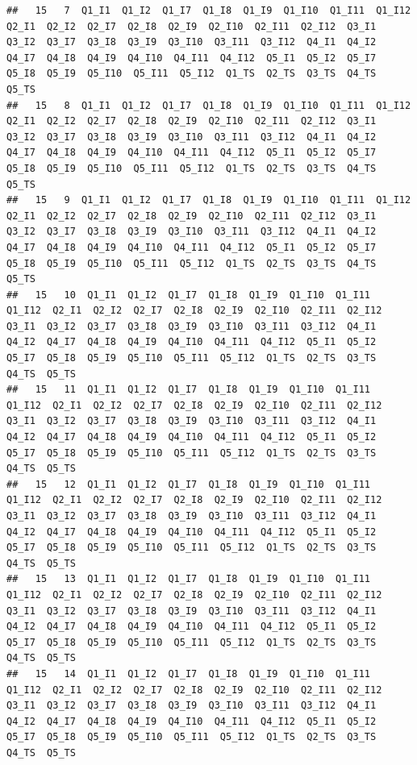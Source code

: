 \documentclass[
]{book}
\begin{document}
\begin{verbatim}
##   15   7  Q1_I1  Q1_I2  Q1_I7  Q1_I8  Q1_I9  Q1_I10  Q1_I11  Q1_I12  Q2_I1  Q2_I2  Q2_I7  Q2_I8  Q2_I9  Q2_I10  Q2_I11  Q2_I12  Q3_I1  Q3_I2  Q3_I7  Q3_I8  Q3_I9  Q3_I10  Q3_I11  Q3_I12  Q4_I1  Q4_I2  Q4_I7  Q4_I8  Q4_I9  Q4_I10  Q4_I11  Q4_I12  Q5_I1  Q5_I2  Q5_I7  Q5_I8  Q5_I9  Q5_I10  Q5_I11  Q5_I12  Q1_TS  Q2_TS  Q3_TS  Q4_TS  Q5_TS
##   15   8  Q1_I1  Q1_I2  Q1_I7  Q1_I8  Q1_I9  Q1_I10  Q1_I11  Q1_I12  Q2_I1  Q2_I2  Q2_I7  Q2_I8  Q2_I9  Q2_I10  Q2_I11  Q2_I12  Q3_I1  Q3_I2  Q3_I7  Q3_I8  Q3_I9  Q3_I10  Q3_I11  Q3_I12  Q4_I1  Q4_I2  Q4_I7  Q4_I8  Q4_I9  Q4_I10  Q4_I11  Q4_I12  Q5_I1  Q5_I2  Q5_I7  Q5_I8  Q5_I9  Q5_I10  Q5_I11  Q5_I12  Q1_TS  Q2_TS  Q3_TS  Q4_TS  Q5_TS
##   15   9  Q1_I1  Q1_I2  Q1_I7  Q1_I8  Q1_I9  Q1_I10  Q1_I11  Q1_I12  Q2_I1  Q2_I2  Q2_I7  Q2_I8  Q2_I9  Q2_I10  Q2_I11  Q2_I12  Q3_I1  Q3_I2  Q3_I7  Q3_I8  Q3_I9  Q3_I10  Q3_I11  Q3_I12  Q4_I1  Q4_I2  Q4_I7  Q4_I8  Q4_I9  Q4_I10  Q4_I11  Q4_I12  Q5_I1  Q5_I2  Q5_I7  Q5_I8  Q5_I9  Q5_I10  Q5_I11  Q5_I12  Q1_TS  Q2_TS  Q3_TS  Q4_TS  Q5_TS
##   15   10  Q1_I1  Q1_I2  Q1_I7  Q1_I8  Q1_I9  Q1_I10  Q1_I11  Q1_I12  Q2_I1  Q2_I2  Q2_I7  Q2_I8  Q2_I9  Q2_I10  Q2_I11  Q2_I12  Q3_I1  Q3_I2  Q3_I7  Q3_I8  Q3_I9  Q3_I10  Q3_I11  Q3_I12  Q4_I1  Q4_I2  Q4_I7  Q4_I8  Q4_I9  Q4_I10  Q4_I11  Q4_I12  Q5_I1  Q5_I2  Q5_I7  Q5_I8  Q5_I9  Q5_I10  Q5_I11  Q5_I12  Q1_TS  Q2_TS  Q3_TS  Q4_TS  Q5_TS
##   15   11  Q1_I1  Q1_I2  Q1_I7  Q1_I8  Q1_I9  Q1_I10  Q1_I11  Q1_I12  Q2_I1  Q2_I2  Q2_I7  Q2_I8  Q2_I9  Q2_I10  Q2_I11  Q2_I12  Q3_I1  Q3_I2  Q3_I7  Q3_I8  Q3_I9  Q3_I10  Q3_I11  Q3_I12  Q4_I1  Q4_I2  Q4_I7  Q4_I8  Q4_I9  Q4_I10  Q4_I11  Q4_I12  Q5_I1  Q5_I2  Q5_I7  Q5_I8  Q5_I9  Q5_I10  Q5_I11  Q5_I12  Q1_TS  Q2_TS  Q3_TS  Q4_TS  Q5_TS
##   15   12  Q1_I1  Q1_I2  Q1_I7  Q1_I8  Q1_I9  Q1_I10  Q1_I11  Q1_I12  Q2_I1  Q2_I2  Q2_I7  Q2_I8  Q2_I9  Q2_I10  Q2_I11  Q2_I12  Q3_I1  Q3_I2  Q3_I7  Q3_I8  Q3_I9  Q3_I10  Q3_I11  Q3_I12  Q4_I1  Q4_I2  Q4_I7  Q4_I8  Q4_I9  Q4_I10  Q4_I11  Q4_I12  Q5_I1  Q5_I2  Q5_I7  Q5_I8  Q5_I9  Q5_I10  Q5_I11  Q5_I12  Q1_TS  Q2_TS  Q3_TS  Q4_TS  Q5_TS
##   15   13  Q1_I1  Q1_I2  Q1_I7  Q1_I8  Q1_I9  Q1_I10  Q1_I11  Q1_I12  Q2_I1  Q2_I2  Q2_I7  Q2_I8  Q2_I9  Q2_I10  Q2_I11  Q2_I12  Q3_I1  Q3_I2  Q3_I7  Q3_I8  Q3_I9  Q3_I10  Q3_I11  Q3_I12  Q4_I1  Q4_I2  Q4_I7  Q4_I8  Q4_I9  Q4_I10  Q4_I11  Q4_I12  Q5_I1  Q5_I2  Q5_I7  Q5_I8  Q5_I9  Q5_I10  Q5_I11  Q5_I12  Q1_TS  Q2_TS  Q3_TS  Q4_TS  Q5_TS
##   15   14  Q1_I1  Q1_I2  Q1_I7  Q1_I8  Q1_I9  Q1_I10  Q1_I11  Q1_I12  Q2_I1  Q2_I2  Q2_I7  Q2_I8  Q2_I9  Q2_I10  Q2_I11  Q2_I12  Q3_I1  Q3_I2  Q3_I7  Q3_I8  Q3_I9  Q3_I10  Q3_I11  Q3_I12  Q4_I1  Q4_I2  Q4_I7  Q4_I8  Q4_I9  Q4_I10  Q4_I11  Q4_I12  Q5_I1  Q5_I2  Q5_I7  Q5_I8  Q5_I9  Q5_I10  Q5_I11  Q5_I12  Q1_TS  Q2_TS  Q3_TS  Q4_TS  Q5_TS

\end{verbatim}
\end{document}
